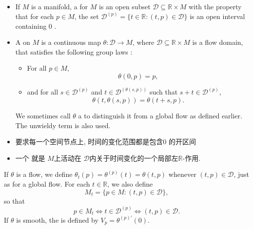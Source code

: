 \documentclass[../main.tex]{subfiles}
\begin{document}
\begin{definition}{}{}
\begin{itemize}
    \item If $M$ is a manifold, a  for $M$ is an open subset $\mathcal{D} \subseteq \mathbb{R} \times M$ with the property that for each $p \in M$, the set $\mathcal{D}^{(p)} = \{t \in \mathbb{R} : (t, p) \in \mathcal{D}\}$ is an open interval containing 0 . 
    \item A  on $M$ is a continuous map $\theta: \mathcal{D} \to M$, where $\mathcal{D} \subseteq \mathbb{R} \times M$ is a flow domain, that satisfies the following group laws : 
 \begin{itemize}
        \item For all $p \in M$,
\begin{equation}
\theta(0, p) = p,
\end{equation}
\item 
and for all $s \in \mathcal{D}^{(p)}$ and $t \in \mathcal{D}^{(\theta(s,p))}$ such that $s + t \in \mathcal{D}^{(p)}$,
\begin{equation}
\theta(t, \theta(s, p)) = \theta(t + s, p).
\end{equation}
    \end{itemize}
    We sometimes call $\theta$ a  to distinguish it from a global flow as defined earlier. The unwieldy term  is also used.
\end{itemize}
\end{definition}
\begin{note}
    \begin{itemize}
        \item {} 要求每一个空间节点上, 时间的变化范围都是包含\(  0  \) 的开区间
        \item 一个 就是 \(  M  \)上活动在 \(  \mathcal{D}  \)内关于时间变化的一个局部左\(  \mathbb{R}   \)-作用.   
    \end{itemize}
    
\end{note}

\begin{definition}{}{}
    If $\theta$ is a flow, we define $\theta_t(p) = \theta^{(p)}(t) = \theta(t, p)$ whenever $(t, p) \in \mathcal{D}$, just as for a global flow. For each $t \in \mathbb{R}$, we also define
\begin{equation}
M_t = \{p \in M : (t, p) \in \mathcal{D}\},
\end{equation}
so that
\[
p \in M_t \Leftrightarrow t \in \mathcal{D}^{(p)} \Leftrightarrow (t, p) \in \mathcal{D}.
\]
If $\theta$ is smooth, the  is defined by $V_p = \theta^{(p)\prime}(0)$.
\end{definition}
\end{document}
